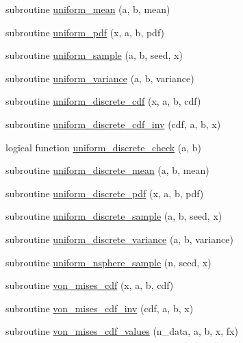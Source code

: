 \begin{DoxyCompactItemize}
\item 
subroutine \hyperlink{_bhabha__fortran__sem__doxy_8f_a3073152f6052f105e100e23e980a9dce}{uniform\+\_\+mean} (a, b, mean)
\item 
subroutine \hyperlink{_bhabha__fortran__sem__doxy_8f_a05ec2d1bc3328a8aad5e598852bcbf14}{uniform\+\_\+pdf} (x, a, b, pdf)
\item 
subroutine \hyperlink{_bhabha__fortran__sem__doxy_8f_af92ef0ba8e3c9c529f7b1c4eb0bed4c0}{uniform\+\_\+sample} (a, b, seed, x)
\item 
subroutine \hyperlink{_bhabha__fortran__sem__doxy_8f_a9f30db560b85d07014de26e90a80c834}{uniform\+\_\+variance} (a, b, variance)
\item 
subroutine \hyperlink{_bhabha__fortran__sem__doxy_8f_a70846f32a4c049b18e01802a92db7d96}{uniform\+\_\+discrete\+\_\+cdf} (x, a, b, cdf)
\item 
subroutine \hyperlink{_bhabha__fortran__sem__doxy_8f_aafa76f1cf208f904b15993e0ef66eb85}{uniform\+\_\+discrete\+\_\+cdf\+\_\+inv} (cdf, a, b, x)
\item 
logical function \hyperlink{_bhabha__fortran__sem__doxy_8f_a422da08e6639b40b1e57fac092fde67d}{uniform\+\_\+discrete\+\_\+check} (a, b)
\item 
subroutine \hyperlink{_bhabha__fortran__sem__doxy_8f_a03a4be1295ed7192ae91041a1e64a807}{uniform\+\_\+discrete\+\_\+mean} (a, b, mean)
\item 
subroutine \hyperlink{_bhabha__fortran__sem__doxy_8f_af3de0b9e0c5a479e445bb097f5e6289a}{uniform\+\_\+discrete\+\_\+pdf} (x, a, b, pdf)
\item 
subroutine \hyperlink{_bhabha__fortran__sem__doxy_8f_a224e9cbefb5f1ef40f22420215fd18af}{uniform\+\_\+discrete\+\_\+sample} (a, b, seed, x)
\item 
subroutine \hyperlink{_bhabha__fortran__sem__doxy_8f_a874a7fc75f53b8a682b9c8978939fda5}{uniform\+\_\+discrete\+\_\+variance} (a, b, variance)
\item 
subroutine \hyperlink{_bhabha__fortran__sem__doxy_8f_a567091bcdecad2248c96535c412d6195}{uniform\+\_\+nsphere\+\_\+sample} (n, seed, x)
\item 
subroutine \hyperlink{_bhabha__fortran__sem__doxy_8f_a5c4785e88e38b424c52cce4689445dfc}{von\+\_\+mises\+\_\+cdf} (x, a, b, cdf)
\item 
subroutine \hyperlink{_bhabha__fortran__sem__doxy_8f_a0d6b2b89e87cdefab6293dcb412af08f}{von\+\_\+mises\+\_\+cdf\+\_\+inv} (cdf, a, b, x)
\item 
subroutine \hyperlink{_bhabha__fortran__sem__doxy_8f_a4c65f800f570436a4cb12dddb3c8b7a3}{von\+\_\+mises\+\_\+cdf\+\_\+values} (n\+\_\+data, a, b, x, fx)

\end{DoxyCompactItemize}
